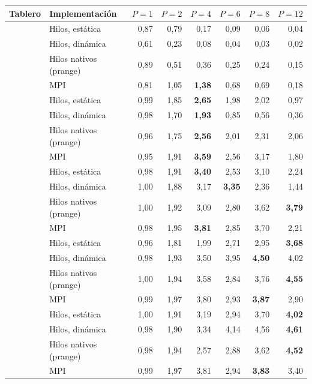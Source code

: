 \begin{tabular}{llrrrrrr}
\toprule
Tablero & Implementación & $P=1$ & $P=2$ & $P=4$ & $P=6$ & $P=8$ & $P=12$ \\
\midrule
{} & Hilos, estática & 0,87 & 0,79 & 0,17 & 0,09 & 0,06 & 0,04 \\
 & Hilos, dinámica & 0,61 & 0,23 & 0,08 & 0,04 & 0,03 & 0,02 \\
 & Hilos nativos (prange) & 0,89 & 0,51 & 0,36 & 0,25 & 0,24 & 0,15 \\
 & MPI & 0,81 & 1,05 & \textbf{1,38} & 0,68 & 0,69 & 0,18 \\
\midrule
{} & Hilos, estática & 0,99 & 1,85 & \textbf{2,65} & 1,98 & 2,02 & 0,97 \\
 & Hilos, dinámica & 0,98 & 1,70 & \textbf{1,93} & 0,85 & 0,56 & 0,36 \\
 & Hilos nativos (prange) & 0,96 & 1,75 & \textbf{2,56} & 2,01 & 2,31 & 2,06 \\
 & MPI & 0,95 & 1,91 & \textbf{3,59} & 2,56 & 3,17 & 1,80 \\
\midrule
{} & Hilos, estática & 0,98 & 1,91 & \textbf{3,40} & 2,53 & 3,10 & 2,24 \\
 & Hilos, dinámica & 1,00 & 1,88 & 3,17 & \textbf{3,35} & 2,36 & 1,44 \\
 & Hilos nativos (prange) & 1,00 & 1,92 & 3,09 & 2,80 & 3,62 & \textbf{3,79} \\
 & MPI & 0,98 & 1,95 & \textbf{3,81} & 2,85 & 3,70 & 2,21 \\
\midrule
{} & Hilos, estática & 0,96 & 1,81 & 1,99 & 2,71 & 2,95 & \textbf{3,68} \\
 & Hilos, dinámica & 0,98 & 1,93 & 3,50 & 3,95 & \textbf{4,50} & 4,02 \\
 & Hilos nativos (prange) & 1,00 & 1,94 & 3,58 & 2,84 & 3,76 & \textbf{4,55} \\
 & MPI & 0,99 & 1,97 & 3,80 & 2,93 & \textbf{3,87} & 2,90 \\
\midrule
{} & Hilos, estática & 1,00 & 1,91 & 3,19 & 2,94 & 3,70 & \textbf{4,02} \\
 & Hilos, dinámica & 0,98 & 1,90 & 3,34 & 4,14 & 4,56 & \textbf{4,61} \\
 & Hilos nativos (prange) & 0,98 & 1,94 & 2,57 & 2,88 & 3,62 & \textbf{4,52} \\
 & MPI & 0,99 & 1,97 & 3,81 & 2,94 & \textbf{3,83} & 3,40 \\
\bottomrule
\end{tabular}
